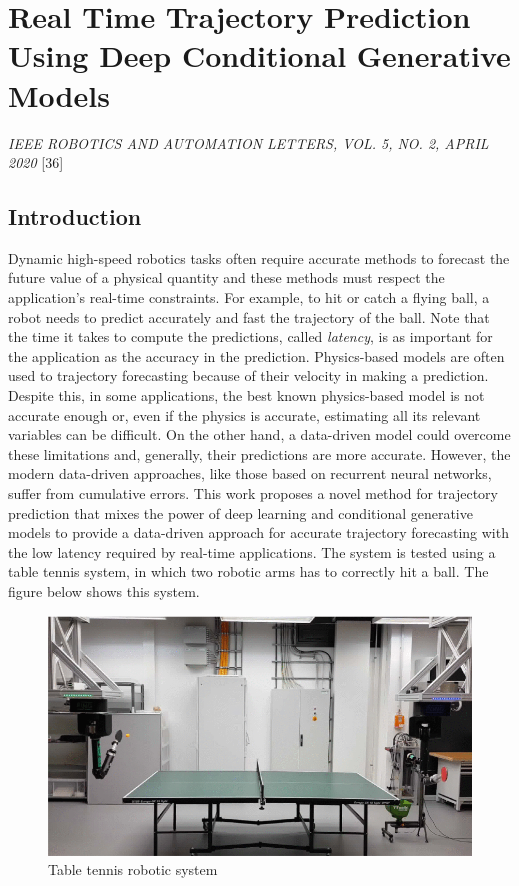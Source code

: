 \section{Real Time Trajectory Prediction Using Deep Conditional
Generative Models}\label{header-n953}

\emph{IEEE ROBOTICS AND AUTOMATION LETTERS, VOL. 5, NO. 2, APRIL 2020}
{[}36{]}

\subsection{Introduction}\label{header-n955}

Dynamic high-speed robotics tasks often require accurate methods to
forecast the future value of a physical quantity and these methods must
respect the application's real-time constraints. For example, to hit or
catch a flying ball, a robot needs to predict accurately and fast the
trajectory of the ball. Note that the time it takes to compute the
predictions, called \emph{latency}, is as important for the application
as the accuracy in the prediction. Physics-based models are often used
to trajectory forecasting because of their velocity in making a
prediction. Despite this, in some applications, the best known
physics-based model is not accurate enough or, even if the physics is
accurate, estimating all its relevant variables can be difficult. On the
other hand, a data-driven model could overcome these limitations and,
generally, their predictions are more accurate. However, the modern
data-driven approaches, like those based on recurrent neural networks,
suffer from cumulative errors. This work proposes a novel method for
trajectory prediction that mixes the power of deep learning and
conditional generative models to provide a data-driven approach for
accurate trajectory forecasting with the low latency required by
real-time applications. The system is tested using a table tennis
system, in which two robotic arms has to correctly hit a ball. The
figure below shows this system.

\begin{figure}[h!]
\centering
\includegraphics[width=0.7\linewidth]{images/tabletennis.png}
\caption{Table tennis robotic system}
\end{figure}

